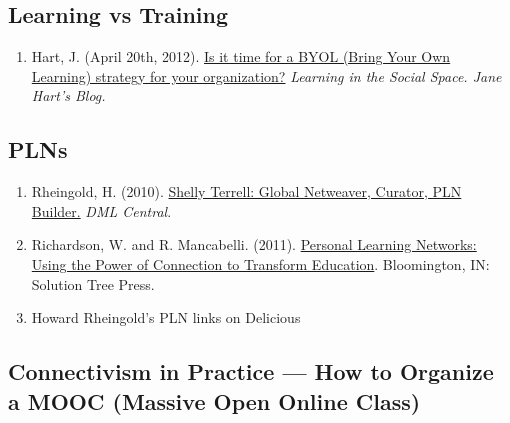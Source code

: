 \subsection{Learning vs Training}\label{rec:learning-vs-training}

\begin{enumerate}
\def\labelenumi{\arabic{enumi}.}
\itemsep1pt\parskip0pt
\item
  Hart, J. (April 20th, 2012).
  \href{http://www.c4lpt.co.uk/blog/2012/04/20/is-it-time-for-a-byol-bring-your-own-learning-strategy-in-your-organization-byol/}{Is
  it time for a BYOL (Bring Your Own Learning) strategy for your
  organization?} \emph{Learning in the Social Space. Jane Hart's Blog.}
\end{enumerate}

\subsection{PLNs}\label{rec:plns}

\begin{enumerate}
\def\labelenumi{\arabic{enumi}.}
\item
  Rheingold, H. (2010).
  \href{http://dmlcentral.net/blog/howard-rheingold/shelly-terrell-global-netweaver-curator-pln-builder}{Shelly
  Terrell: Global Netweaver, Curator, PLN Builder.} \emph{DML Central}.
\item
  Richardson, W. and R. Mancabelli. (2011).
  \href{http://www.amazon.com/Personal-Learning-Networks-Connections-Transform/dp/193554327X}{Personal
  Learning Networks: Using the Power of Connection to Transform
  Education}. Bloomington, IN: Solution Tree Press.
\item
  Howard Rheingold's PLN links on Delicious
\end{enumerate}

\subsection{Connectivism in Practice --- How to Organize a MOOC (Massive
Open Online
Class)}\label{rec:connectivism-in-practice-how-to-organize-a-mooc-massive-open-online-class}

